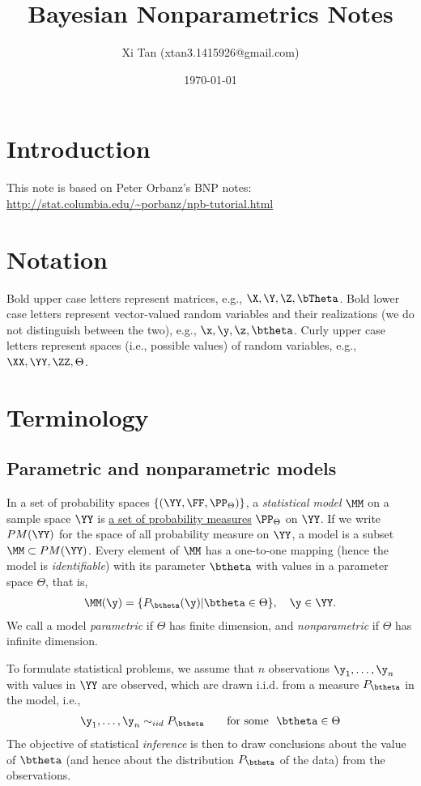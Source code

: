 \documentclass{article}
\title{Bayesian Nonparametrics Notes}
\author{Xi Tan (xtan3.1415926@gmail.com)}
\date{\today}
\begin{document}
\maketitle
\tableofcontents


\section{Introduction}
This note is based on Peter Orbanz's BNP notes:
\vspace*{5mm}
\\
\url{http://stat.columbia.edu/~porbanz/npb-tutorial.html}

\section{Notation}
Bold upper case letters represent matrices, e.g., $\X, \Y, \Z, \bTheta$. Bold lower case letters represent vector-valued random variables and their realizations (we do not distinguish between the two), e.g., $\x, \y, \z, \btheta$. Curly upper case letters represent spaces (i.e., possible values) of random variables, e.g., $\XX, \YY, \ZZ, \Theta$.

\section{Terminology}
\subsection{Parametric and nonparametric models}
In a set of probability spaces $\{(\YY, \FF, \PP_\Theta)\}$, a {\em{statistical model}} $\MM$ on a sample space $\YY$ is {\underline{a set of probability measures}} $\PP_\Theta$ on $\YY$. If we write $PM(\YY)$ for the space of all probability measure on $\YY$, a model is a subset $\MM \subset PM(\YY)$. Every element of $\MM$ has a one-to-one mapping (hence the model is {\em{identifiable}}) with its parameter $\btheta$ with values in a parameter space $\Theta$, that is,
\begin{align}
\MM(\y) = \{P_\btheta(\y) | \btheta \in \Theta\},\quad \y \in \YY.
\end{align}
We call a model {\em{parametric}} if $\Theta$ has finite dimension, and {\em{nonparametric}} if $\Theta$ has infinite dimension.

To formulate statistical problems, we assume that $n$ observations $\y_1,\dots,\y_n$ with values in $\YY$ are observed, which are drawn i.i.d. from a measure $P_\btheta$ in the model, i.e.,
\begin{align}
\y_1, \dots, \y_n \sim_{iid} P_\btheta \qquad \text{for some}~~ \btheta \in \Theta
\end{align}
The objective of statistical {\em{inference}} is then to draw conclusions about the value of $\btheta$ (and hence about the distribution $P_\btheta$ of the data) from the observations.
\end{document}
